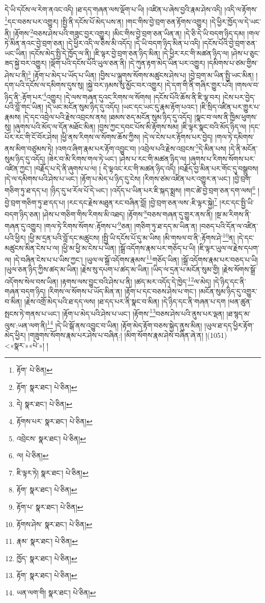 དེ་ཡི་དངོས་ལ་རེག་ནའང་འདི། །ཐ་དད་གཞན་ལས་ལྡོག་པ་ཡི། །འཛིན་པ་ཞེས་བྱའི་རྣམ་ཤེས་འདི། །འདི་ལ་རྟོགས་\footnote{རྟོག་  པེ་ཅིན། }དང་བཅས་པར་འགྱུར། །སྤྱི་ནི་དངོས་པོ་མེད་པས་ན། །གང་གིས་བྱེ་བྲག་ཅན་རྟོགས་འགྱུར། །དེ་ཕྱིར་ཁྱོད་ལ་དེ་ཡང་ནི། །རྟོགས་\footnote{རྟོག་  སྣར་ཐང་།  པེ་ཅིན། }བཅས་ཤེས་པའི་གཟུང་བྱར་འགྱུར། །མིང་གིས་བྱེ་བྲག་ཅན་ཡིན་ན། །དེ་ཅི་དེ་ཡི་བདག་ཉིད་དམ། །གལ་ཏེ་མིན་ནའང་བྱེ་བྲག་ཅན། །དེ་ཕྱིར་འདི་ལ་ཅིས་མི་འདོད། །དེ་ཡི་བདག་ཉིད་མིན་པ་འདི། །དངོས་པོའི་བྱེ་བྲག་ཅན་ཡང་ཡིན། །དངོས་མེད་སྤྱི་དེ་ཁྱོད་ལ་ནི། །ཇི་ལྟར་བྱེ་བྲག་ཅན་ཉིད་མིན། །དེ་ཕྱིར་རང་གི་མཚན་ཉིད་ལ། །ཤེས་པ་ཅུང་ཟད་སྐྱེ་བར་འགྱུར། །ལྡོག་པའི་དངོས་པོའི་ཡུལ་ཅན་ནི། །དེ་ཀུན་རྟག་མེད་ཡིན་པར་འགྱུར། །དམིགས་པ་ཙམ་གྱིས་ཤེས་པ་ནི།\footnote{དེ།  སྣར་ཐང་།  པེ་ཅིན། } །རྟོག་པ་མེད་པ་ཡོད་པ་ཡིན། །བྱིས་པ་ལྐུགས་སོགས་མཚུངས་ཤེས་པ། །བྱེ་བྲག་མ་ཡིན་སྤྱི་ཡང་མིན། །དག་པའི་དངོས་ལ་དམིགས་དུས་སུ། །སྐྱེ་བར་ཉམས་སུ་མྱོང་བར་འགྱུར། །དེ་དག་གི་ནི་གཞིར་གྱུར་པའི། །གསལ་བ་ཉིད་ནི་:རྟོག་པར་\footnote{རྟོགས་པར་  སྣར་ཐང་།  པེ་ཅིན། }འགྱུར། །དེ་ལས་གཞན་དུའང་རིགས་ལ་སོགས། །དངོས་པོའི་ཆོས་ནི་ཇི་ལྟ་བར། །ངེས་པར་བྱེད་པའི་བློ་གང་ཡིན། །དེ་ཡང་མངོན་སུམ་ཉིད་དུ་འདོད། །ཡང་དང་ཡང་དུ་རྣམ་རྟོག་པའང་། །ཇི་སྲིད་འཛིན་པར་གྱུར་པ་རྣམས། །དེ་དང་འབྲེལ་པའི་རྗེས་འབྲངས་ནས། །ཐམས་ཅད་མངོན་སུམ་ཉིད་དུ་འདོད། །སྣང་བ་ལས་ནི་ཁྱིམ་ཕུགས་སུ། །ཞུགས་པའི་མོད་ལ་དོན་མཐོང་མིན། །བྱས་ཀྱང་དབང་པོས་མི་རྟོགས་སམ། །ཇི་ལྟར་སྣང་བའི་མོད་ཉིད་ལ། །དང་པོར་རང་གི་ངོ་བོར་ཤེས། །ཕྱི་ནས་རིགས་ལ་སོགས་ཆོས་ཀྱིས། །དེ་ལ་ངེས་པར་རྟོགས་པར་བྱེད། །གལ་ཏེ་དམིགས་ནས་མིག་བཙུམས་ཏེ། །འགའ་ཞིག་རྣམ་པར་རྟོག་འབྱུང་བ། །འབྲེལ་པའི་རྗེས་འབྲངས་\footnote{འབྲེངས་  སྣར་ཐང་།  པེ་ཅིན། }དེ་མིན་པས། །དེ་ནི་མངོན་སུམ་ཉིད་དུ་འདོད། །ཟེར་བ་མི་རིགས་གལ་ཏེ་ཡང་། །ཤེས་པ་རང་གི་མཚན་ཉིད་ལ། །ཞུགས་པ་རིགས་སོགས་པར་འཛིན་ཀྱང་། །བརྗོད་པ་དེ་ནི་ཞུགས་པ་ལ། །
དེ་ལྟའང་རང་གི་མཚན་ཉིད་འདི། །བརྗོད་བྱ་མིན་པར་གོང་དུ་བསྒྲུབས། །དེ་ལ་དམིགས་པའི་ཤེས་པ་ཡང་། །རྟོག་པ་མེད་པ་ཉིད་དུ་ངེས། །རིགས་ཙམ་འཛིན་པར་འགྱུར་ན་ཡང་། །བྱེ་བྲག་གཅིག་ཏུ་ཐ་དད་པ། །ཉིད་དུ་ཕ་རོལ་པོ་དེ་ཡང་། །འདོད་པ་ཡིན་པར་ཇི་སྐད་སྨྲས། །གང་ཚེ་བྱེ་བྲག་ཅན་དག་ལས།\footnote{ལ།  པེ་ཅིན། } །བྱེ་བྲག་གཅིག་ཏུ་ཐ་དད་པ། །རང་དང་རྗེས་མཐུན་རང་བཞིན་བློ། །བྱེ་བྲག་ཅན་ལས་:ཇི་ལྟར་སྐྱེ།\footnote{ཇི་ལྟར་ཏེ།  སྣར་ཐང་།  པེ་ཅིན། } །རང་དང་སྤྱི་ཡི་བདག་ཉིད་ཅན། །ཤེས་པ་གཅིག་གིས་རིགས་མི་འཐད། །རྟོགས་\footnote{རྟོག་  སྣར་ཐང་།  པེ་ཅིན། }བཅས་གཞན་དུ་གྱུར་ནས་ནི། །སྔ་མ་རིགས་ནི་གཞན་དུ་འགྱུར། །གལ་ཏེ་རིགས་སོགས་:རྟོགས་པ་\footnote{རྟོག་པ་  སྣར་ཐང་།  པེ་ཅིན། }ཅན། །གཅིག་ཏུ་ཐ་དད་མ་ཡིན་ན། །བཅད་པའི་དོན་ལ་འཛིན་པའི་ཕྱིར། །ཕྱི་མ་དྲན་པའི་བློ་དང་མཚུངས། །སྤྱི་ཡི་དངོས་པོ་དུ་མ་ཡིས། །མི་གསལ་བ་ནི་:རྟོགས་ཤེ་\footnote{རྟོགས་ཤེས་  སྣར་ཐང་།  པེ་ཅིན། }ན། །དེ་དང་མཚུངས་མིན་ངེས་པ་ལ། །ཕྱི་མ་ཕྱི་མ་ངེས་པ་ཡིན། །སྒྲོ་འདོགས་རྣམ་པར་གཅོད་པ་ཡི། །ཇི་ལྟར་ཡུལ་ལ་རྗེས་དཔག་ལ། །དེ་བཞིན་ངེས་པ་པ་ཡིས་ཀྱང་། །ཡུལ་ལ་སྒྲོ་འདོགས་རྣམས་\footnote{རྣམ་  སྣར་ཐང་།  པེ་ཅིན། }གཅོད་ཡིན། །སྒྲོ་འདོགས་རྣམ་པར་བཅད་པ་ཡི། །ཡུལ་ཅན་ཉིད་ཀྱིས་ཚད་མ་ཡིན། །རྗེས་སུ་དཔག་པ་ཚད་མ་ཡིན། །ཡིད་ལ་དྲན་པ་མངོན་སུམ་གྱི། །རྗེས་སོགས་སྒྲོ་འདོགས་སེལ་བས་ཡིན། །རྟགས་ལས་བྱུང་བའི་ཤེས་པ་ནི། །ཚད་མར་འདོད་དེ་ཁྱེད་\footnote{ཁྱོད་  སྣར་ཐང་།  པེ་ཅིན། }ལ་མེད། །དེ་ཉིད་དང་ནི་གཞན་བདག་ཉིད། །རིགས་ལ་སོགས་པ་ཡོད་མིན་ན། །རྟོག་པ་དང་བཅས་ཤེས་པ་གང་། །མངོན་སུམ་ཉིད་དུ་འགྱུར་བ་མིན། །རྗེས་འགྲོ་མེད་པའི་ཐ་དད་ལས། །ཐ་དད་པར་ནི་སྣང་བ་མིན། །དེ་ཉིད་དང་ནི་གཞན་པ་དག །ཕན་ཚུན་སྤངས་ཏེ་གནས་པ་ཡང་། །རྟོག་པ་མེད་པའི་ཤེས་པ་ཡང་། །རྟོགས་\footnote{རྟོག་  སྣར་ཐང་།  པེ་ཅིན། }བཅས་ཤེས་པའི་ནུས་པར་ལྡན། །ཐ་སྙད་མ་ལུས་:ཡན་ལག་ནི།\footnote{ཡན་ལག་གི།  སྣར་ཐང་།  པེ་ཅིན། } །དེ་ཡི་སྒོ་ནས་འབྱུང་བ་ཡིན། །རྟོག་མེད་རྟོག་བཅས་སྐྱེད་ནུས་མིན། །ཡུལ་ཐ་དད་ཕྱིར་རྟོག་མེད་ཕྱིར། །གཟུགས་སོགས་རྣམ་པར་ཤེས་པ་བཞིན:། །མིག་སོགས་རྣམ་ཤེས་བཞིན་ཞེ་ན། །(1051) <«སྣར་»«པེ་»། །
